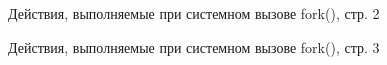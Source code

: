 \documentclass[a4paper,oneside,14pt]{extreport}
\begin{document}
\begin{figure}[h]
	\caption{Действия, выполняемые при системном вызове fork(), стр. 2}
	\label{fork2}
\end{figure}

\begin{figure}[h]
	\caption{Действия, выполняемые при системном вызове fork(), стр. 3}
	\label{fork3}
\end{figure}
\end{document}
